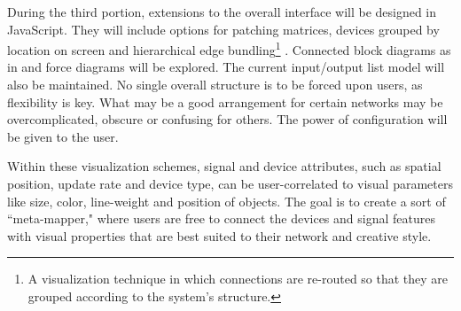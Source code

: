 \documentclass[11pt]{article}
\begin{document}
  During the third portion, extensions to the overall interface will be designed in JavaScript. 
  They will include options for patching matrices, devices grouped by location on screen and hierarchical edge bundling\footnote{A visualization technique in which connections are re-routed so that they are grouped according to the system's structure.} \cite{HEB}. Connected block diagrams as in \cite{integra} and force diagrams %
   will be explored. The current input/output list model will also be maintained. No single overall structure is to be forced upon users, as flexibility is key. What may be a good arrangement for certain networks may be overcomplicated, obscure or confusing for others. The power of configuration will be given to the user.
  
  Within these visualization schemes, signal and device attributes, such as spatial position, update rate and device type, can be user-correlated to visual parameters like size, color, line-weight and position of objects. The goal is to create a sort of ``meta-mapper," where users are free to connect the devices and signal features with visual properties that are best suited to their network and creative style.
  
\end{document}
